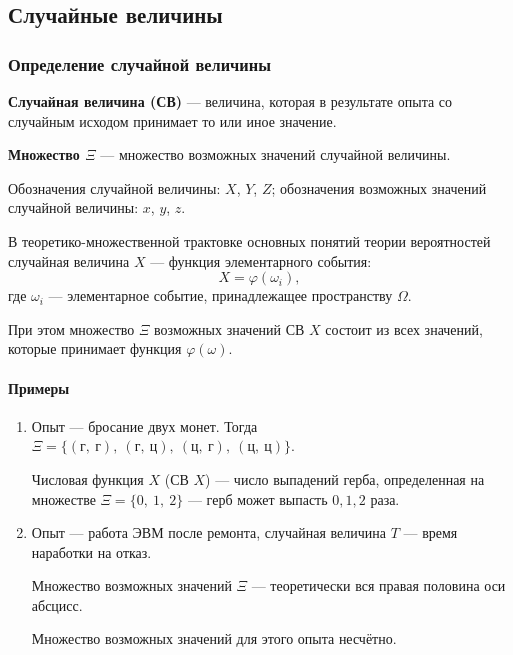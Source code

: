 \documentclass[a4paper]{article}
\newcommand{\key}[1]{{\color{Medium}\bfseries #1}}
\begin{document}
        \subsection{Случайные величины}

            \subsubsection{Определение случайной величины}

                \key{Случайная величина (СВ)} --- величина, которая в результате опыта со случайным исходом принимает то или иное значение.
                
                \key{Множество \boldmath$\Xi$} --- множество возможных значений случайной величины.
                
                Обозначения случайной величины: $X$, $Y$, $Z$; \newline
                обозначения возможных значений случайной величины: $x$, $y$, $z$.

                В теоретико-множественной трактовке основных понятий теории вероятностей случайная величина $X$ --- функция элементарного события:
                \begin{equation*}
                    X = \varphi (\omega_i) ,
                \end{equation*}
                где $\omega_i$ --- элементарное событие, принадлежащее пространству $\Omega$.
                
                При этом множество $\Xi$ возможных значений СВ $X$ состоит из всех значений, которые принимает функция $\varphi (\omega)$.

                \paragraph{Примеры}

                    \begin{enumerate}
                        \item Опыт --- бросание двух монет. Тогда $\Xi = \{ (\text{г}, \: \text{г}) , \: (\text{г}, \: \text{ц}) , \: (\text{ц}, \: \text{г}) , \: (\text{ц}, \: \text{ц}) \}$.
                        
                        Числовая функция $X$ (СВ $X$) --- число выпадений герба, определенная на множестве $\Xi = \{ 0, \: 1, \: 2 \}$ --- герб может выпасть $0, 1, 2$ раза.

                        \item Опыт --- работа ЭВМ после ремонта, случайная величина $T$ --- время наработки на отказ.
                        
                        Множество возможных значений $\Xi$ --- теоретически вся правая половина оси абсцисс.
                        
                        Множество возможных значений для этого опыта несчётно.
                    \end{enumerate}
\end{document}
